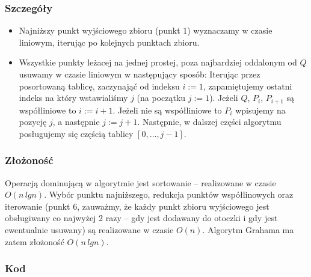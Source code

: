 \documentclass[11pt]{article}
\theoremstyle{remark} \newtheorem{definition}{def.}
\theoremstyle{definition} \newtheorem{twierdzenie}{tw.}
\begin{document}
    \subsubsection{Szczegóły}

    \begin{itemize}
        \item   Najniższy punkt wyjściowego zbioru (punkt 1) wyznaczamy w czasie liniowym, iterując po kolejnych punktach zbioru. 
        \item   Wszystkie punkty leżacej na jednej prostej, poza najbardziej oddalonym od $Q$ usuwamy w czasie liniowym w następujący sposób:
                Iterując przez posortowaną tablicę, zaczynająć od indeksu $i := 1$, zapamiętujemy ostatni indeks na który wstawialiśmy $j$ (na początku $j := 1$).
                Jeżeli $Q$, $P_i$, $P_{i+1}$ są współliniowe to $i := i+1$. Jeżeli nie są współliniowe to $P_i$ wpisujemy na pozycję $j$, a następnie $j := j + 1$. Następnie, 
                w dalszej części algorytmu posługujemy się częścią tablicy $[0, \ldots, j - 1]$.
    \end{itemize}    


    \subsubsection{Złożoność}
    
    Operacją dominującą w algorytmie jest sortowanie -- realizowane w czasie $O(n \, lgn)$. Wybór punktu najniższego, redukcja punktów współlinowych oraz iterowanie (punkt 6, 
    zauważmy, że każdy punkt zbioru wyjściowego jest obsługiwany co najwyżej 2 razy -- gdy jest dodawany do otoczki i gdy jest ewentualnie usuwany) są realizowane w
    czasie $O(n)$. Algorytm Grahama ma zatem złożoność $O(n \, lgn)$.


    \subsubsection{Kod}
\end{document}
